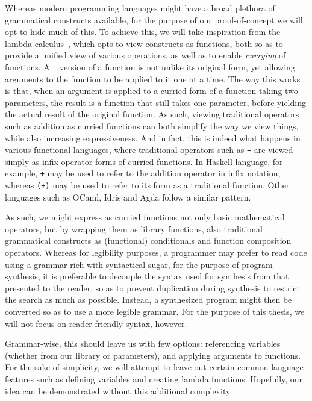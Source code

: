 \documentclass{article}
\begin{document}
Whereas modern programming languages might have a broad plethora of grammatical constructs available,
for the purpose of our proof-of-concept we will opt to hide much of this.
To achieve this, we will take inspiration from the lambda calculus~\citep{lambdacalculus},
which opts to view constructs as functions,
both so as to provide a unified view of various operations, as well as to enable \emph{currying} of functions.
A ~\citep{currying} version of a function is not unlike its original form,
yet allowing arguments to the function to be applied to it one at a time.
The way this works is that, when an argument is applied to a curried form of a function taking two parameters,
the result is a function that still takes one parameter, before yielding the actual result of the original function.
As such, viewing traditional operators such as addition as curried functions can both simplify the way we view things,
while also increasing expressiveness.
And in fact, this is indeed what happens in various functional languages,
where traditional operators such as \verb|+| are viewed simply as infix operator forms of curried functions.
In Haskell language, for example, \verb|+| may be used to refer to the addition operator in infix notation,
whereas \verb|(+)| may be used to refer to its form as a traditional function.
Other languages such as OCaml, Idris and Agda follow a similar pattern.

As such, we might express as curried functions not only basic mathematical operators,
but by wrapping them as library functions,
also traditional grammatical constructs as (functional) conditionals and function composition operators.
Whereas for legibility purposes, a programmer may prefer to read code using a grammar rich with syntactical sugar,
for the purpose of program synthesis,
it is preferable to decouple the syntax used for synthesis from that presented to the reader,
so as to prevent duplication during synthesis to restrict the search as much as possible.
Instead, a synthesized program might then be converted so as to use a more legible grammar.
For the purpose of this thesis, we will not focus on reader-friendly syntax, however.

Grammar-wise, this should leave us with few options:
referencing variables (whether from our library or parameters),
and applying arguments to functions.
For the sake of simplicity,
we will attempt to leave out certain common language features such as defining variables and creating lambda functions.
Hopefully, our idea can be demonstrated without this additional complexity.
\end{document}
